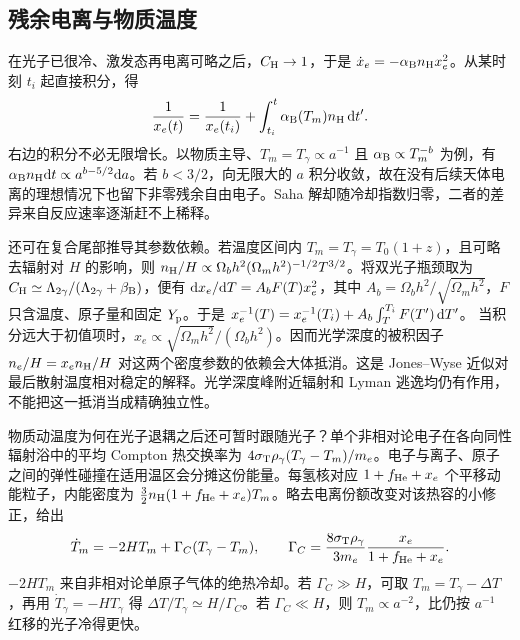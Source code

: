 \subsection{残余电离与物质温度}

在光子已很冷、激发态再电离可略之后，$C_{\rm H}\to1$，于是 $\dot x_e=-\alpha_{\rm B}n_{\rm H}x_e^2$。从某时刻 $t_i$ 起直接积分，得
\begin{equation}\label{eq:cosmo-residual-ionization}
 \frac1{x_e(t)}=\frac1{x_e(t_i)}
       +\int_{t_i}^t\alpha_{\rm B}(T_m)n_{\rm H}\,\dd t' .
\end{equation}
右边的积分不必无限增长。以物质主导、$T_m=T_\gamma\propto a^{-1}$ 且 $\alpha_{\rm B}\propto T_m^{-b}$ 为例，有 $\alpha_{\rm B}n_{\rm H}\dd t\propto a^{b-5/2}\dd a$。若 $b<3/2$，向无限大的 $a$ 积分收敛，故在没有后续天体电离的理想情况下也留下非零残余自由电子。Saha 解却随冷却指数归零，二者的差异来自反应速率逐渐赶不上稀释。

还可在复合尾部推导其参数依赖。若温度区间内 $T_m=T_\gamma=T_0(1+z)$，且可略去辐射对 $H$ 的影响，则 $n_{\rm H}/H\propto\Omega_bh^2(\Omega_mh^2)^{-1/2}T^{3/2}$。将双光子瓶颈取为 $C_{\rm H}\simeq\Lambda_{2\gamma}/(\Lambda_{2\gamma}+\beta_{\rm B})$，便有 $\dd x_e/\dd T=A_b F(T)x_e^2$，其中 $A_b=\Omega_bh^2/\sqrt{\Omega_mh^2}$，$F$ 只含温度、原子量和固定 $Y_{\rm p}$。于是 $x_e^{-1}(T)=x_e^{-1}(T_i)+A_b\int_T^{T_i}F(T')\,\dd T'$。
当积分远大于初值项时，$x_e\propto\sqrt{\Omega_mh^2}/(\Omega_bh^2)$。因而光学深度的被积因子 $n_e/H=x_e n_{\rm H}/H$ 对这两个密度参数的依赖会大体抵消。这是 Jones--Wyse 近似对最后散射温度相对稳定的解释。光学深度峰附近辐射和 Lyman 逃逸均仍有作用，不能把这一抵消当成精确独立性。

物质动温度为何在光子退耦之后还可暂时跟随光子？单个非相对论电子在各向同性辐射浴中的平均 Compton 热交换率为 $4\sigma_{\rm T}\rho_\gamma(T_\gamma-T_m)/m_e$。电子与离子、原子之间的弹性碰撞在适用温区会分摊这份能量。每氢核对应 $1+f_{\rm He}+x_e$ 个平移动能粒子，内能密度为 $\tfrac32n_{\rm H}(1+f_{\rm He}+x_e)T_m$。略去电离份额改变对该热容的小修正，给出
\begin{equation}\label{eq:cosmo-matter-temperature}
 \dot T_m=-2HT_m+\Gamma_C(T_\gamma-T_m),\qquad
 \Gamma_C=\frac{8\sigma_{\rm T}\rho_\gamma}{3m_e}
          \frac{x_e}{1+f_{\rm He}+x_e}.
\end{equation}
$-2HT_m$ 来自非相对论单原子气体的绝热冷却。若 $\Gamma_C\gg H$，可取 $T_m=T_\gamma-\Delta T$，再用 $\dot T_\gamma=-HT_\gamma$ 得 $\Delta T/T_\gamma\simeq H/\Gamma_C$。若 $\Gamma_C\ll H$，则 $T_m\propto a^{-2}$，比仍按 $a^{-1}$ 红移的光子冷得更快。

